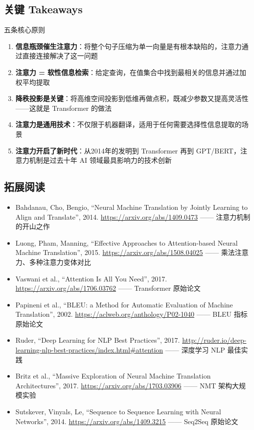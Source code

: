 \subsection{关键 Takeaways}

\begin{importantbox}{五条核心原则}
\begin{enumerate}
    \item \textbf{信息瓶颈催生注意力}：将整个句子压缩为单一向量是有根本缺陷的，注意力通过直接连接解决了这一问题
    \item \textbf{注意力 = 软性信息检索}：给定查询，在值集合中找到最相关的信息并通过加权平均提取
    \item \textbf{降秩投影是关键}：将高维空间投影到低维再做点积，既减少参数又提高灵活性——这就是 Transformer 的做法
    \item \textbf{注意力是通用技术}：不仅限于机器翻译，适用于任何需要选择性信息提取的场景
    \item \textbf{注意力开启了新时代}：从2014年的发明到 Transformer 再到 GPT/BERT，注意力机制是过去十年 AI 领域最具影响力的技术创新
\end{enumerate}
\end{importantbox}

\subsection{拓展阅读}

\begin{itemize}
    \item Bahdanau, Cho, Bengio, ``Neural Machine Translation by Jointly Learning to Align and Translate'', 2014. \url{https://arxiv.org/abs/1409.0473} —— 注意力机制的开山之作
    \item Luong, Pham, Manning, ``Effective Approaches to Attention-based Neural Machine Translation'', 2015. \url{https://arxiv.org/abs/1508.04025} —— 乘法注意力、多种注意力变体对比
    \item Vaswani et al., ``Attention Is All You Need'', 2017. \url{https://arxiv.org/abs/1706.03762} —— Transformer 原始论文
    \item Papineni et al., ``BLEU: a Method for Automatic Evaluation of Machine Translation'', 2002. \url{https://aclweb.org/anthology/P02-1040} —— BLEU 指标原始论文
    \item Ruder, ``Deep Learning for NLP Best Practices'', 2017. \url{http://ruder.io/deep-learning-nlp-best-practices/index.html#attention} —— 深度学习 NLP 最佳实践
    \item Britz et al., ``Massive Exploration of Neural Machine Translation Architectures'', 2017. \url{https://arxiv.org/abs/1703.03906} —— NMT 架构大规模实验
    \item Sutskever, Vinyals, Le, ``Sequence to Sequence Learning with Neural Networks'', 2014. \url{https://arxiv.org/abs/1409.3215} —— Seq2Seq 原始论文
\end{itemize}



